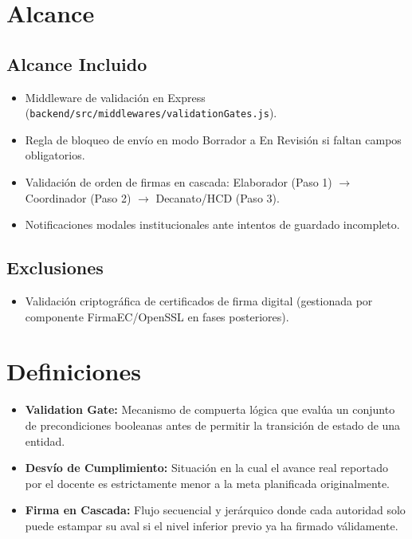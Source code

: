 \documentclass[12pt,a4paper]{article}
\begin{document}
\section{Alcance}

\subsection{Alcance Incluido}
\begin{itemize}[leftmargin=1.5em, itemsep=1.5pt]
    \item Middleware de validación en Express (\texttt{backend/src/middlewares/validationGates.js}).
    \item Regla de bloqueo de envío en modo Borrador a En Revisión si faltan campos obligatorios.
    \item Validación de orden de firmas en cascada: Elaborador (Paso 1) $\rightarrow$ Coordinador (Paso 2) $\rightarrow$ Decanato/HCD (Paso 3).
    \item Notificaciones modales institucionales ante intentos de guardado incompleto.
\end{itemize}

\subsection{Exclusiones}
\begin{itemize}[leftmargin=1.5em, itemsep=1.5pt]
    \item Validación criptográfica de certificados de firma digital (gestionada por componente FirmaEC/OpenSSL en fases posteriores).
\end{itemize}

\section{Definiciones}
\begin{itemize}[leftmargin=1.5em, itemsep=2pt]
    \item \textbf{Validation Gate:} Mecanismo de compuerta lógica que evalúa un conjunto de precondiciones booleanas antes de permitir la transición de estado de una entidad.
    \item \textbf{Desvío de Cumplimiento:} Situación en la cual el avance real reportado por el docente es estrictamente menor a la meta planificada originalmente.
    \item \textbf{Firma en Cascada:} Flujo secuencial y jerárquico donde cada autoridad solo puede estampar su aval si el nivel inferior previo ya ha firmado válidamente.
\end{itemize}
\end{document}

